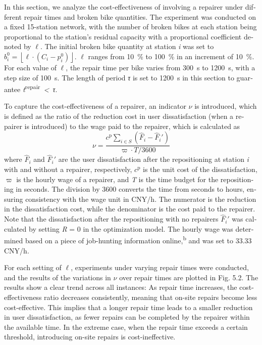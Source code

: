 \documentclass[
  english,
]{article}
\begin{document}
\begin{otherlanguage}{english}
\protect{}\label{p0665}
In this section, we analyze the cost-effectiveness of involving a repairer under different repair
times and broken bike quantities. The experiment was conducted on a fixed 15-station network, with
the number of broken bikes at each station being proportional to the station's residual capacity
with a proportional coefficient denoted by \(\ell\). The initial broken bike quantity at station
\emph{i} was set to
\(b_{i}^{0} = \left\lfloor {\ell \cdot \left( {C_{i} - p_{i}^{0}} \right)} \right\rfloor\). \(\ell\)
ranges from 10~\% to 100~\% in an increment of 10~\%. For each value of \(\ell\), the repair time
per bike varies from 300~s to 1200~s, with a step size of 100~s. The length of period \emph{τ} is
set to 1200~s in this section to guarantee \emph{t}\textsuperscript{repair}~\emph{\textless~τ}.

\protect{}\label{p0670}
To capture the cost-effectiveness of a repairer, an indicator \(\nu\) is introduced, which is
defined as the ratio of the reduction cost in user dissatisfaction (when a repairer is introduced)
to the wage paid to the repairer, which is calculated
as\[\tag{73}\nu = \frac{c^{\text{p}}\sum_{i \in S}\left( {{\widehat{F}}_{i} - {\widehat{F}}_{i}'} \right)}{\left. \varpi \cdot T/3600 \right.}\]where
\({\widehat{F}}_{i}\) and \({\widehat{F}}_{i}'\) are the user dissatisfaction after the
repositioning at station \emph{i} with and without a repairer, respectively, \(c^{\text{p}}\) is the
unit cost of the dissatisfaction, \(\varpi\) is the hourly wage of a repairer, and \emph{T} is the
time budget for the repositioning in seconds. The division by 3600 converts the time from seconds to
hours, ensuring consistency with the wage unit in CNY/h. The numerator is the reduction in the
dissatisfaction cost, while the denominator is the cost paid to the repairer. Note that the
dissatisfaction after the repositioning with no repairers \({\widehat{F}}_{i}'\) was calculated by
setting \textbar{}\emph{R}\textbar{} = 0 in the optimization model. The hourly wage was determined
based on a piece of job-hunting information online,\textsuperscript{b} and was set to 33.33 CNY/h.

\protect{}\label{p0675}
For each setting of \(\ell\), experiments under varying repair times were conducted, and the results
of the variations in \(\nu\) over repair times are plotted in Fig. 5.2. The results show a clear
trend across all instances: As repair time increases, the cost-effectiveness ratio decreases
consistently, meaning that on-site repairs become less cost-effective. This implies that a longer
repair time leads to a smaller reduction in user dissatisfaction, as fewer repairs can be completed
by the repairer within the available time. In the extreme case, when the repair time exceeds a
certain threshold, introducing on-site repairs is cost-ineffective.


\end{otherlanguage}
\end{document}
